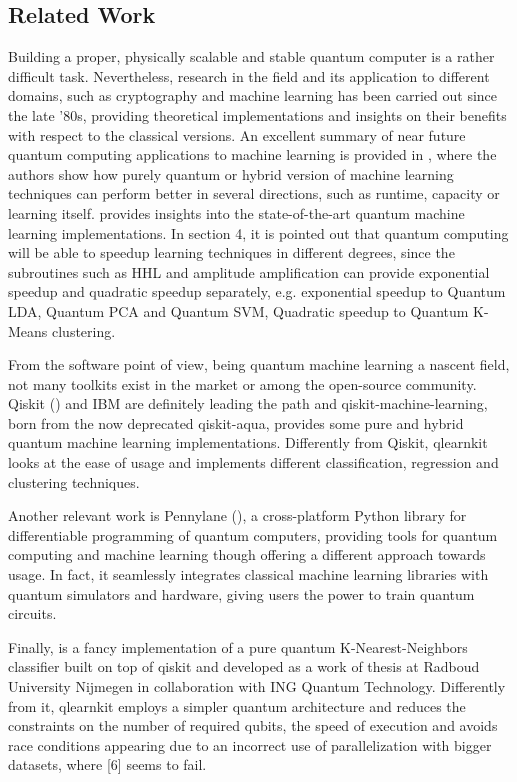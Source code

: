 \documentclass{article}
\begin{document}
\begin{multicols}{2}
\section{Related Work}
Building a proper, physically scalable and stable quantum computer is a rather difficult task. Nevertheless, research in the field and its application to different domains, such as cryptography and machine learning has been carried out since the late '80s, providing theoretical implementations and insights on their benefits with respect to the classical versions. An excellent summary of near future quantum computing applications to machine learning is provided in \cite{phillipson}, where the authors show how purely quantum or hybrid version of machine learning techniques can perform better in several directions, such as runtime, capacity or learning itself.
\cite{zhang} provides insights into the state-of-the-art quantum machine learning implementations. In section 4, it is pointed out that quantum computing will be able to speedup learning techniques in different degrees, since the subroutines such as HHL and amplitude amplification can provide exponential speedup and quadratic speedup separately, e.g. exponential speedup to Quantum LDA, Quantum PCA and Quantum SVM, Quadratic speedup to Quantum K-Means clustering.

From the software point of view, being quantum machine learning a nascent field, not many toolkits exist in the market or among the open-source community. Qiskit (\cite{Qiskit}) and IBM are definitely  leading the path and qiskit-machine-learning, born from the now deprecated qiskit-aqua, provides some pure and hybrid quantum machine learning implementations. Differently from Qiskit, qlearnkit looks at the ease of usage and implements different classification, regression and clustering techniques.

Another relevant work is Pennylane (\cite{Pennylane}), a cross-platform Python library for differentiable programming of quantum computers, providing tools for quantum computing and machine learning though offering a different approach towards usage. In fact, it seamlessly integrates classical machine learning libraries with quantum simulators and hardware, giving users the power to train quantum circuits. 

Finally, \cite{qknn} is a fancy implementation of a pure quantum K-Nearest-Neighbors classifier built on top of qiskit and developed as a work of thesis at Radboud University Nijmegen in collaboration with ING Quantum Technology. Differently from it, qlearnkit employs a simpler quantum architecture and reduces the constraints on the number of required qubits, the speed of execution and avoids race conditions appearing due to an incorrect use of parallelization with bigger datasets, where [6] seems to fail.


\end{multicols}
\end{document}
